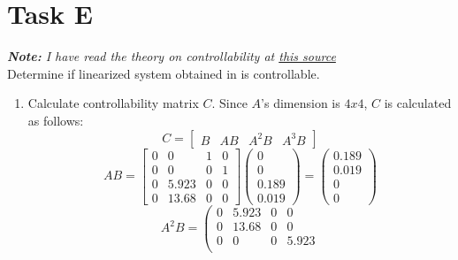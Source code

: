 \documentclass[12pt,letterpaper]{article}
\begin{document}
\section*{Task E}
\label{Q:E}
    \textit{\textbf{Note:} I have read the theory on controllability at \href{https://www.ece.rutgers.edu/~gajic/psfiles/chap5traCO.pdf}{this source}} \\
    Determine if linearized system obtained in  is controllable. 
    \begin{enumerate}
        \item Calculate controllability matrix $C$. Since $A$'s dimension is $4x4$, $C$ is calculated as follows: 
        \begin{equation*}
            C =
            \begin{bmatrix}
                B & AB & A^2B & A^3B
            \end{bmatrix}
        \end{equation*}
        \begin{equation*}
            AB =
            \left[\begin{matrix}
                0 & 0 & 1 & 0 \\
                0 & 0 & 0 & 1 \\
                0 & 5.923 & 0 & 0 \\
                0 & 13.68 & 0 & 0
            \end{matrix}\right]
            \left(\begin{matrix}
                0 \\
                0 \\
                0.189 \\
                0.019
            \end{matrix}\right)
            =
            \left(\begin{matrix}
                0.189 \\
                0.019 \\
                0 \\
                0
            \end{matrix}\right)
        \end{equation*}
        \begin{equation*}
            A^2B =
            \left(\begin{matrix}
                0 & 5.923 & 0 & 0 \\
                0 & 13.68 & 0 & 0 \\
                0 & 0 & 0 & 5.923 \\

\end{matrix}
\end{equation*}
\end{enumerate}
\end{document}
